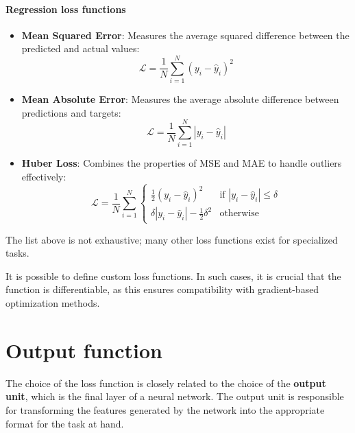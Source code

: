 \paragraph{Regression loss functions}
\begin{itemize}
    \item \textbf{Mean Squared Error}: Measures the average squared difference
          between the predicted and actual values:
          \begin{equation}
              \mathcal{L} = \frac{1}{N} \sum_{i=1}^N (y_i - \hat{y}_i)^2
          \end{equation}
    \item \textbf{Mean Absolute Error}: Measures the average absolute difference
          between predictions and targets:
          \begin{equation}
              \mathcal{L} = \frac{1}{N} \sum_{i=1}^N |y_i - \hat{y}_i|
          \end{equation}
    \item \textbf{Huber Loss}: Combines the properties of MSE and MAE to handle
          outliers effectively:
          \begin{equation}
              \mathcal{L} = \frac{1}{N} \sum_{i=1}^N \begin{cases}
                  \frac{1}{2}(y_i - \hat{y}_i)^2                  & \text{if } |y_i - \hat{y}_i| \leq \delta \\
                  \delta |y_i - \hat{y}_i| - \frac{1}{2} \delta^2 & \text{otherwise}
              \end{cases}
          \end{equation}
\end{itemize}
\begin{note}
    The list above is not exhaustive; many other loss functions exist for specialized
    tasks.

    It is possible to define custom loss functions. In such cases, it is crucial
    that the function is differentiable, as this ensures compatibility with
    gradient-based optimization methods.
\end{note}
\section{Output function}
The choice of the loss function is closely related to the choice of the \textbf{
    output unit}, which is the final layer of a neural network. The output unit
is responsible for transforming the features generated by the network into the
appropriate format for the task at hand.

